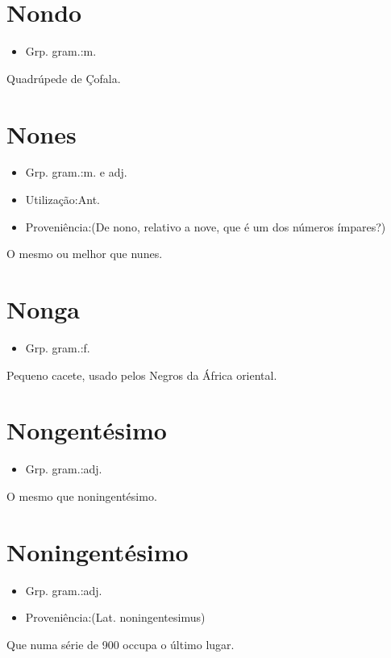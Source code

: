 \section{Nondo}
\begin{itemize}
\item {Grp. gram.:m.}
\end{itemize}
Quadrúpede de Çofala.
\section{Nones}
\begin{itemize}
\item {Grp. gram.:m.  e  adj.}
\end{itemize}
\begin{itemize}
\item {Utilização:Ant.}
\end{itemize}
\begin{itemize}
\item {Proveniência:(De \textunderscore nono\textunderscore , relativo a \textunderscore nove\textunderscore , que é um dos números ímpares?)}
\end{itemize}
O mesmo ou melhor que \textunderscore nunes\textunderscore .
\section{Nonga}
\begin{itemize}
\item {Grp. gram.:f.}
\end{itemize}
Pequeno cacete, usado pelos Negros da África oriental.
\section{Nongentésimo}
\begin{itemize}
\item {Grp. gram.:adj.}
\end{itemize}
O mesmo que \textunderscore noningentésimo\textunderscore .
\section{Noningentésimo}
\begin{itemize}
\item {Grp. gram.:adj.}
\end{itemize}
\begin{itemize}
\item {Proveniência:(Lat. \textunderscore noningentesimus\textunderscore )}
\end{itemize}
Que numa série de 900 occupa o último lugar.
